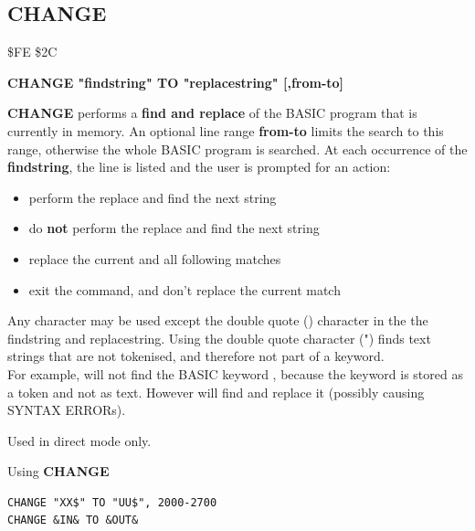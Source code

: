 \newpage
\subsection{CHANGE}
\begin{description}[leftmargin=2cm,style=nextline]
\item [Token:] \$FE \$2C
\item [Format:] {\bf CHANGE "findstring" TO "replacestring" [,from-to]}
\item [Usage:]  {\bf CHANGE} performs a {\bf find and replace} of the BASIC program
                that is currently in memory.
   An optional line range {\bf from-to} limits the search to this range,
   otherwise the whole BASIC program is searched.
   At each oc\-cur\-rence of the {\bf findstring}, the line is
   listed and the user is prompted for an action:
    \begin{itemize}
      \item {}  perform the replace and find the next string
      \item {}  do {\bf not} perform the replace and find the next string
      \item \megakey{*}  replace the current and all following matches
      \item {} exit the command, and don't replace the current match
    \end{itemize}
\item [Remarks:] Any character may be used except the
   double quote () character in the
   the findstring and replacestring.
   Using the double quote character (") finds text strings that are
   not tokenised, and therefore not part of a keyword. \\
   For example,  will not find
   the BASIC keyword , because the
   keyword is stored as a token and not as text.
   However  will
   find and replace it (possibly causing SYNTAX ERRORs).

   Used in direct mode only.

\item [Examples:] Using {\bf CHANGE}
\begin{tcolorbox}[colback=black,coltext=white]
\verbatimfont{\codefont}
\begin{verbatim}
CHANGE "XX$" TO "UU$", 2000-2700
CHANGE &IN& TO &OUT&
\end{verbatim}
\end{tcolorbox}
\end{description}

